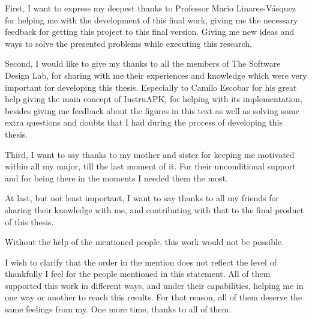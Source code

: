 \documentclass[
12pt, %
english, %
onehalfspacing, %
nolistspacing, %
liststotoc, %
parskip, %
headsepline, %
consistentlayout, %
]{MastersDoctoralThesis} %
\begin{document}
\begin{acknowledgements}
\addchaptertocentry{\acknowledgementname} %

First, I want to express my deepest thanks to Professor Mario Linares-Vásquez for helping me with the development of this final work, giving me the necessary feedback for getting this project to this final version. Giving me new ideas and ways to solve the presented problems while executing this research.

Second, I would like to give my thanks to all the members of The Software Design Lab, for sharing with me their experiences and knowledge which were very important for developing this thesis. Especially to Camilo Escobar for his great help giving the main concept of InstruAPK, for helping with its implementation, besides giving me feedback about the figures in this text as well as solving some extra questions and doubts that I had during the process of developing this thesis.

Third, I want to say thanks to my mother and sister for keeping me motivated within all my major, till the last moment of it. For their unconditional support and for being there in the moments I needed them the most. 

At last, but not least important, I want to say thanks to all my friends for sharing their knowledge with me, and contributing with that to the final product of this thesis. 

Without the help of the mentioned people, this work would not be possible.

I wish to clarify that the order in the mention does not reflect the level of thankfully I feel for the people mentioned in this statement. All of them supported this work in different ways, and under their capabilities, helping me in one way or another to reach this results. For that reason, all of them deserve the same feelings from my. One more time, thanks to all of them.
\end{acknowledgements}


\tableofcontents %

\listoffigures %

\listoftables %
\end{document}
